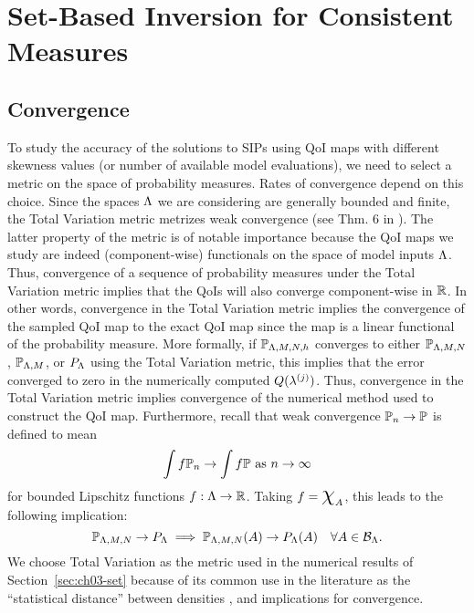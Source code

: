 

\section{Set-Based Inversion for Consistent Measures}\label{sec:set-based}








\subsection{Convergence}
To study the accuracy of the solutions to SIPs using QoI maps with different skewness values (or number of available model evaluations), we need to select a metric on the space of probability measures.
Rates of convergence depend on this choice.
Since the spaces ${\Lambda}$ we are considering are generally bounded and finite, the Total Variation metric metrizes weak convergence (see Thm. 6 in \cite{GS02}).
The latter property of the metric is of notable importance because the QoI maps we study are indeed (component-wise) functionals on the space of model inputs ${\Lambda}$.
Thus, convergence of a sequence of probability measures under the Total Variation metric implies that the QoIs will also converge component-wise in $\mathbb{R}$.
In other words, convergence in the Total Variation metric implies the convergence of the sampled QoI map to the exact QoI map since the map is a linear functional of the probability measure.
More formally, if $\mathbb{P}_{{\Lambda},M,N,h}$ converges to either $\mathbb{P}_{{\Lambda},M,N}$, $\mathbb{P}_{{\Lambda},M}$, or $P_{\Lambda}$ using the Total Variation metric, this implies that the error converged to zero in the numerically computed $Q(\lambda^{(j)})$.
Thus, convergence in the Total Variation metric implies convergence of the numerical method used to construct the QoI map.
Furthermore, recall that weak convergence $\mathbb{P}_n \to \mathbb{P}$ is defined to mean
\[
\int f \mathbb{P}_n \to \int f \mathbb{P} \text{ as } n \to \infty
\]
for bounded Lipschitz functions $f:{\Lambda}\to\mathbb{R}$.
Taking $f = \Chi_A$, this leads to the following implication:
\[
\mathbb{P}_{{\Lambda}, M, N} \to P_{\Lambda} \implies \mathbb{P}_{{\Lambda}, M, N} (A) \to P_{\Lambda} (A) \quad \forall{A\in\mathcal{B}_{{\Lambda}}}.
\]
We choose Total Variation as the metric used in the numerical results of Section~\ref{sec:ch03-set} because of its common use in the literature as the ``statistical distance'' between densities \cite{GS02, Silverman}, and implications for convergence.


